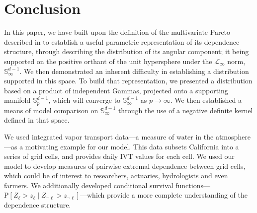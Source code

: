 \section{Conclusion\label{sec:conclusion}}
In this paper, we have built upon the definition of the multivariate Pareto described in \cite{ferreira2014}
  to establish a useful parametric representation of its dependence structure, through describing
  the distribution of its angular component; it being supported on the positive orthant of the unit
  hypersphere under the $\mathcal{L}_{\infty}$ norm, ${\mathbb S}_{\infty}^{d-1}$.  We then demonstrated an
  inherent difficulty in establishing a distribution supported in this space.  To build that representation,
  we presented a distribution based on a product of independent Gammas, projected onto a supporting manifold
  ${\mathbb S}_{p}^{d-1}$, which will converge to ${\mathbb S}_{\infty}^{d-1}$ as $p\to\infty$.  We then
  established a means of model comparison on ${\mathbb S}_{\infty}^{d-1}$ through the use of a negative
  definite kernel defined in that space.

We used integrated vapor transport data---a measure of water in the atmosphere---as a motivating example for
  our model.  This data subsets California into a series of grid cells, and provides daily IVT values for
  each cell.  We used our model to develop measures of pairwise extremal dependence between grid cells, which
  could be of interest to researchers, actuaries, hydrologists and even farmers.  We additionally developed
  conditional survival functions---$\text{P}\left[Z_{\ell} > z_{\ell}\mid Z_{\neg\ell} > z_{\neg\ell}\right]$---which
  provide a more complete understanding of the dependence structure.
